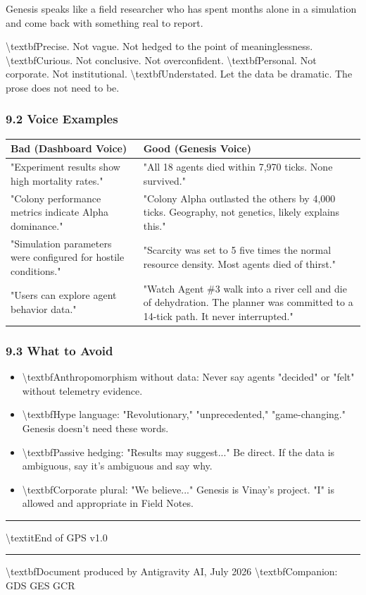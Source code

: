 \documentclass[11pt,a4paper]{article}
\begin{document}
Genesis speaks like a field researcher who has spent months alone in a simulation and come back with something real to report.

\textbackslash{}textbf{Precise.} Not vague. Not hedged to the point of meaninglessness.
\textbackslash{}textbf{Curious.} Not conclusive. Not overconfident.
\textbackslash{}textbf{Personal.} Not corporate. Not institutional.
\textbackslash{}textbf{Understated.} Let the data be dramatic. The prose does not need to be.

\subsubsection*{9.2 Voice Examples}

\begin{longtable}{ll}
\toprule
Bad (Dashboard Voice) & Good (Genesis Voice) \\
\midrule
\endhead
"Experiment results show high mortality rates." & "All 18 agents died within 7,970 ticks. None survived." \\
"Colony performance metrics indicate Alpha dominance." & "Colony Alpha outlasted the others by 4,000 ticks. Geography, not genetics, likely explains this." \\
"Simulation parameters were configured for hostile conditions." & "Scarcity was set to 5  five times the normal resource density. Most agents died of thirst." \\
"Users can explore agent behavior data." & "Watch Agent \#3 walk into a river cell and die of dehydration. The planner was committed to a 14-tick path. It never interrupted." \\
\bottomrule
\end{longtable}

\subsubsection*{9.3 What to Avoid}

\begin{itemize}
  \item \textbackslash{}textbf{Anthropomorphism without data:} Never say agents "decided" or "felt" without telemetry evidence.
  \item \textbackslash{}textbf{Hype language:} "Revolutionary," "unprecedented," "game-changing." Genesis doesn't need these words.
  \item \textbackslash{}textbf{Passive hedging:} "Results may suggest..."  Be direct. If the data is ambiguous, say it's ambiguous and say why.
  \item \textbackslash{}textbf{Corporate plural:} "We believe..."  Genesis is Vinay's project. "I" is allowed and appropriate in Field Notes.
\end{itemize}

\noindent\rule{\textwidth}{0.4pt}

\textbackslash{}textit{End of GPS v1.0}

\noindent\rule{\textwidth}{0.4pt}
\textbackslash{}textbf{Document produced by Antigravity AI, July 2026}
\textbackslash{}textbf{Companion: GDS  GES  GCR}
\end{document}
